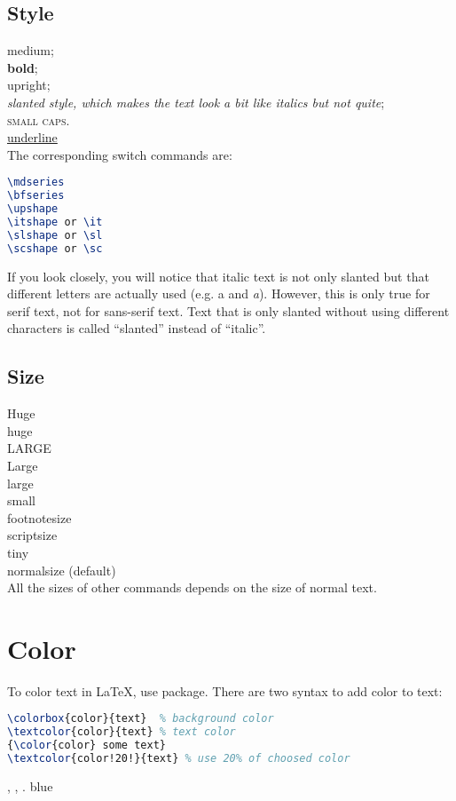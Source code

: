 \subsection{Style}
\textmd{medium};    \\
\textbf{bold}; \\
\textup{upright};   \\
\textsl{slanted style, which makes the text look a bit like \textit{italics}
but not quite}; \\
\textsc{small caps}. \\
\underline{underline}	\\
The corresponding switch commands are:
\begin{lstlisting}[language=TeX]
\mdseries
\bfseries
\upshape 
\itshape or \it
\slshape or \sl
\scshape or \sc
\end{lstlisting}
If you look closely, you will notice that italic text is not only slanted
but that different letters are actually used (e.g. a and {\it a}). 
However, this is only true for serif text, not for sans-serif text. Text
that is only slanted without using different characters is called 
``slanted'' instead of ``italic''.

\subsection{Size}
{\Huge Huge} \\
{\huge huge} \\
{\LARGE LARGE}	\\
{\Large Large}	\\
{\large large}	\\
{\small small}	\\
{\footnotesize footnotesize} \\
{\scriptsize scriptsize}	\\
{\tiny tiny} \\
{\normalsize normalsize (default)}    \\
All the sizes of other commands depends on the size of normal text.


\section{Color}
To color text in \LaTeX{}, use  package. There are 
two syntax to add color to text:
\begin{lstlisting}[language=TeX]
\colorbox{color}{text}	% background color
\textcolor{color}{text}	% text color
{\color{color} some text}
\textcolor{color!20!}{text}	% use 20% of choosed color
\end{lstlisting}
, , .
\colorbox{blue!30}{blue}

